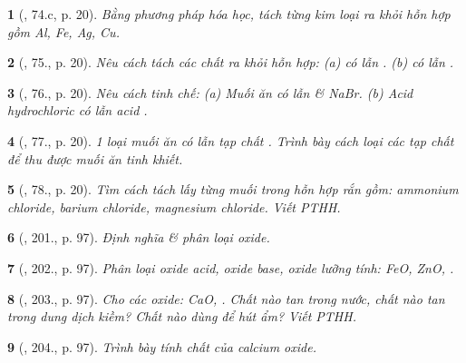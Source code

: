 \documentclass{article}
\newtheorem{baitoan}{}
\begin{document}
\begin{baitoan}[\cite{An_400_BT_Hoa_Hoc_9}, 74.c, p. 20]
	Bằng phương pháp hóa học, tách từng kim loại ra khỏi hỗn hợp gồm {\rm Al, Fe, Ag, Cu}.
\end{baitoan}

\begin{baitoan}[\cite{An_400_BT_Hoa_Hoc_9}, 75., p. 20]
	Nêu cách tách các chất ra khỏi hỗn hợp: (a) {\rm{} có lẫn }. (b) {\rm{} có lẫn }.
\end{baitoan}

\begin{baitoan}[\cite{An_400_BT_Hoa_Hoc_9}, 76., p. 20]
	Nêu cách tinh chế: (a) Muối ăn có lẫn {\rm{}} \& {\rm NaBr}. (b) Acid hydrochloric có lẫn acid {\rm{}}.
\end{baitoan}

\begin{baitoan}[\cite{An_400_BT_Hoa_Hoc_9}, 77., p. 20]
	1 loại muối ăn có lẫn tạp chất {\rm{}}. Trình bày cách loại các tạp chất để thu được muối ăn tinh khiết.
\end{baitoan}

\begin{baitoan}[\cite{An_400_BT_Hoa_Hoc_9}, 78., p. 20]
	Tìm cách tách lấy từng muối trong hỗn hợp rắn gồm: ammonium chloride, barium chloride, magnesium chloride. Viết {\rm PTHH}.
\end{baitoan}

\begin{baitoan}[\cite{Nguyen_Buu_Can_500_BT_Hoa_Hoc_THCS}, 201., p. 97]
	Định nghĩa \& phân loại oxide.
\end{baitoan}

\begin{baitoan}[\cite{Nguyen_Buu_Can_500_BT_Hoa_Hoc_THCS}, 202., p. 97]
	Phân loại oxide acid, oxide base, oxide lưỡng tính: {\rm FeO, ZnO, }.
\end{baitoan}

\begin{baitoan}[\cite{Nguyen_Buu_Can_500_BT_Hoa_Hoc_THCS}, 203., p. 97]
	Cho các oxide: {\rm CaO, }. Chất nào tan trong nước, chất nào tan trong dung dịch kiềm? Chất nào dùng để hút ẩm? Viết {\rm PTHH}.
\end{baitoan}

\begin{baitoan}[\cite{Nguyen_Buu_Can_500_BT_Hoa_Hoc_THCS}, 204., p. 97]
	Trình bày tính chất của calcium oxide.
\end{baitoan}
\end{document}
